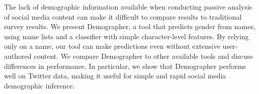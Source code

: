 The lack of demographic information available when conducting passive analysis of social media content can make it difficult to compare results to traditional survey results. We present Demographer, a tool that predicts gender from names, using name lists and a classifier with simple character-level features. By relying only on a name, our tool can make predictions even without extensive user-authored content. We compare Demographer to other available tools and discuss differences in performance. In particular, we show that Demographer performs well on Twitter data, making it useful for simple and rapid social media demographic inference.
